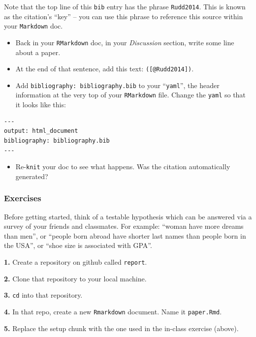 \documentclass[]{book}
\providecommand{\tightlist}{%
  \setlength{\itemsep}{0pt}\setlength{\parskip}{0pt}}
\begin{document}
Note that the top line of this \texttt{bib} entry has the phrase \texttt{Rudd2014}. This is known as the citation's ``key'' -- you can use this phrase to reference this source within your \texttt{Markdown} doc.

\begin{itemize}
\item
  Back in your \texttt{RMarkdown} doc, in your \emph{Discussion} section, write some line about a paper.
\item
  At the end of that sentence, add this text: \texttt{({[}@Rudd2014{]})}.
\item
  Add \texttt{bibliography:\ bibliography.bib} to your ``\texttt{yaml}'', the header information at the very top of your \texttt{RMarkdown} file. Change the \texttt{yaml} so that it looks like this:
\end{itemize}

\begin{verbatim}
---
output: html_document
bibliography: bibliography.bib
---
\end{verbatim}

\begin{itemize}
\tightlist
\item
  Re-\texttt{knit} your doc to see what happens. Was the citation automatically generated?
\end{itemize}

\hypertarget{exercises-13}{%
\subsubsection*{Exercises}\label{exercises-13}}

Before getting started, think of a testable hypothesis which can be answered via a survey of your friends and classmates. For example: ``woman have more dreams than men'', or ``people born abroad have shorter last names than people born in the USA'', or ``shoe size is associated with GPA''.

\textbf{1.} Create a repository on github called \texttt{report}.

\textbf{2.} Clone that repository to your local machine.

\textbf{3.} \texttt{cd} into that repository.

\textbf{4.} In that repo, create a new \texttt{Rmarkdown} document. Name it \texttt{paper.Rmd}.

\textbf{5.} Replace the setup chunk with the one used in the in-class exercise (above).
\end{document}
